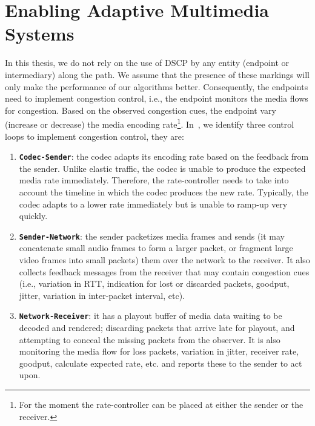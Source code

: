 \section{Enabling Adaptive Multimedia Systems}
\label{rg.title}

In this thesis, we do not rely on the use of DSCP by any entity (endpoint or
intermediary) along the path. We assume that the presence of these markings
will only make the performance of our algorithms better. Consequently, the
endpoints need to implement congestion control, i.e., the endpoint monitors
the media flows for congestion. Based on the observed congestion cues, the
endpoint vary (increase or decrease) the media encoding rate\footnote{For the
moment the rate-controller can be placed at either the sender or the
receiver.}. In~\cite{Singh:control.loops.api}, we identify three control loops
to implement congestion control, they are:

\begin{enumerate}
\setlength{\itemsep}{0pt}

\item \textbf{\texttt{Codec-Sender}}: the codec adapts its encoding rate based
on the feedback from the sender. Unlike elastic traffic, the codec is unable
to produce the expected media rate immediately. Therefore, the rate-controller
needs to take into account the timeline in which the codec produces the new
rate. Typically, the codec adapts to a lower rate immediately but is unable to
ramp-up very quickly.

\item \textbf{\texttt{Sender-Network}}: the sender packetizes media frames and
sends (it may concatenate small audio frames to form a larger packet, or
fragment large video frames into small packets) them over the network to the
receiver. It also collects feedback messages from the receiver that may
contain congestion cues (i.e., variation in RTT, indication for lost or
discarded packets, goodput, jitter, variation in inter-packet interval, etc).

\item \textbf{\texttt{Network-Receiver}}: it has a playout buffer of media
data waiting to be decoded and rendered; discarding packets that arrive late
for playout, and attempting to conceal the missing packets from the observer.
It is  also monitoring the media flow for loss packets, variation in jitter,
receiver rate, goodput, calculate expected rate, etc. and reports these to the
sender to act upon.

\end{enumerate}

